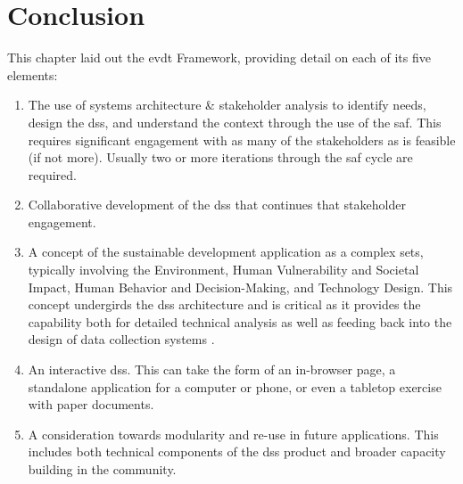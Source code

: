 %
%




\section{Conclusion} \label{sec:evdt-conclusion}

This chapter laid out the \acf{evdt} Framework, providing detail on each of its five elements:

\begin{enumerate}[label=\emph{\Alph*},itemsep=0pt,parsep=0pt]
	\item{The use of systems architecture \& stakeholder analysis to identify needs, design the \ac{dss}, and understand the context through the use of the \acf{saf}. This requires significant engagement with as many of the stakeholders as is feasible (if not more). Usually two or more iterations through the \ac{saf} cycle are required.}
	\item{Collaborative development of the \ac{dss} that continues that stakeholder engagement.}
	\item{A concept of the sustainable development application as a complex \ac{sets}, typically involving the Environment, Human Vulnerability and Societal Impact, Human Behavior and Decision-Making, and Technology Design. This concept undergirds the \ac{dss} architecture and is critical as it provides the capability both for detailed technical analysis as well as feeding back into the design of data collection systems .}
	\item{An interactive \ac{dss}. This can take the form of an in-browser page, a standalone application for a computer or phone, or even a tabletop exercise with paper documents.}
	\item{A consideration towards modularity and re-use in future applications. This includes both technical components of the \ac{dss} product and broader capacity building in the community.}
\end{enumerate}

